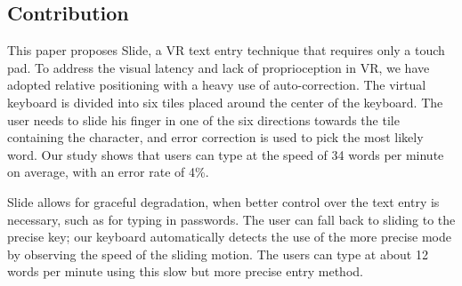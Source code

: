 \subsection{Contribution}
This paper proposes Slide, a VR text entry technique that requires only a touch pad.  To address the visual latency and lack of proprioception in VR, we have adopted relative positioning with a heavy use of auto-correction.  The virtual keyboard is divided into six tiles placed around the center of the keyboard.  The user needs to slide his finger in one of the six directions towards the tile containing the character, and error correction is used to pick the most likely word.  Our study shows that users can type at the speed of 34 words per minute on average, with an error rate of 4\%.   

Slide allows for graceful degradation, when better control over the text entry is necessary, such as for typing in passwords.  The user can fall back to sliding to the precise key; our keyboard automatically detects the use of the more precise mode by observing the speed of the sliding motion.  The users can type at about 12 words per minute using this slow but more precise entry method.

